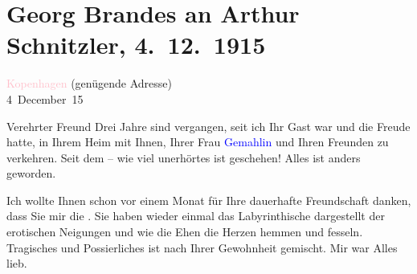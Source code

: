 

\renewcommand{\erwaehntePersonen}{Personen: Georg Brandes, Johann Wolfgang von Goethe, Peter Nansen, Olga Schnitzler}
\renewcommand{\erwaehnteOrte}{Orte: Dänemark, Kopenhagen, Wien}
\renewcommand{\erwaehnteWerke}{Werke: Die Brüder Menthe, Komödie der Worte. Drei Einakter, Macbeth, Professor Bernhardi. Komödie in fünf Akten, Wolfgang Goethe}
\section[Georg Brandes an Arthur Schnitzler, 4. 12. 1915]{Georg Brandes an Arthur Schnitzler, 4. 12. 1915}
\nopagebreak{}
\rehead{ }\normalsize\beginnumbering{}
\toendnotes[C]{\smallbreak\pagebreak[2]}
\toendnotes[C]{\smallbreak}
\pstart
           \raggedleft{}{\pb}\textcolor{pink}{Kopenhagen}{}\ledrightnote{\textcolor{pink}{Kopenhagen}} (genügende Adresse){\\}4 December 15\pend
           
\pstart{}Verehrter Freund\pend
\pstart
           Drei Jahre sind vergangen, seit ich Ihr Gast war und die Freude hatte, in Ihrem Heim
               mit Ihnen, Ihrer Frau \textcolor{blue}{Gemahlin}{}\ledrightnote{{$\rightarrow$}\textcolor{blue}{Olga Schnitzler}} und Ihren Freunden zu verkehren. Seit dem – wie viel unerhörtes ist
               geschehen! Alles ist anders geworden.\pend
           
\pstart
           Ich wollte Ihnen schon vor einem Monat für Ihre dauerhafte Freundschaft danken, dass
               Sie mir die \label{K_L02221-44v}\label{K_L02221-44h}. Sie haben wieder einmal das Labyrinthische dargestellt der erotischen
               Neigungen und wie die Ehen die Herzen hemmen und fesseln. Tragisches und
               Possierliches ist nach Ihrer Gewohnheit gemischt. Mir war Alles lieb.\pend
           
